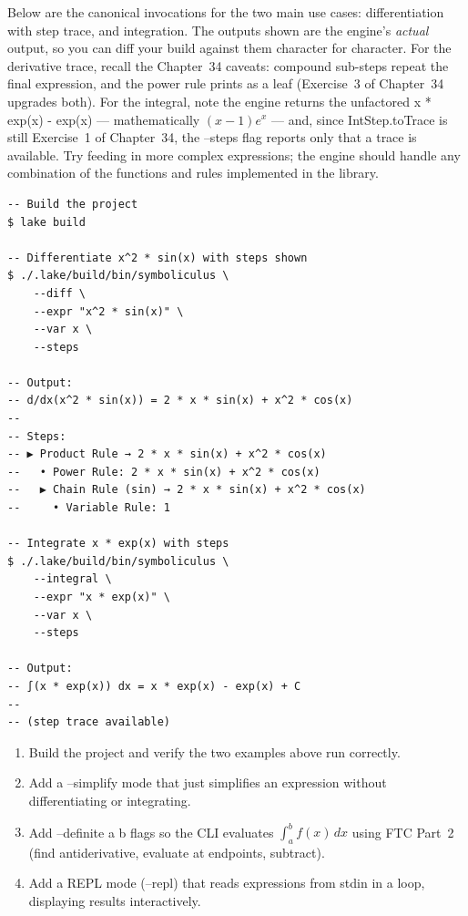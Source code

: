 \documentclass[12pt, openany]{book}
\theoremstyle{plain}
\theoremstyle{definition}
\theoremstyle{remark}
\newcommand{\li}[1]{{\ttfamily\small\color{tealaccent}#1}}
\begin{document}
Below are the canonical invocations for the two main use cases: differentiation with step trace, and integration.  The outputs shown are the engine's \emph{actual} output, so you can diff your build against them character for character.  For the derivative trace, recall the Chapter~34 caveats: compound sub-steps repeat the final expression, and the power rule prints as a leaf (Exercise~3 of Chapter~34 upgrades both).  For the integral, note the engine returns the unfactored \li{x * exp(x) - exp(x)} --- mathematically $(x-1)e^x$ --- and, since \li{IntStep.toTrace} is still Exercise~1 of Chapter~34, the \li{--steps} flag reports only that a trace is available.  Try feeding in more complex expressions; the engine should handle any combination of the functions and rules implemented in the library.

\begin{leanbox}
\begin{lstlisting}
-- Build the project
$ lake build

-- Differentiate x^2 * sin(x) with steps shown
$ ./.lake/build/bin/symboliculus \
    --diff \
    --expr "x^2 * sin(x)" \
    --var x \
    --steps

-- Output:
-- d/dx(x^2 * sin(x)) = 2 * x * sin(x) + x^2 * cos(x)
--
-- Steps:
-- ▶ Product Rule → 2 * x * sin(x) + x^2 * cos(x)
--   • Power Rule: 2 * x * sin(x) + x^2 * cos(x)
--   ▶ Chain Rule (sin) → 2 * x * sin(x) + x^2 * cos(x)
--     • Variable Rule: 1

-- Integrate x * exp(x) with steps
$ ./.lake/build/bin/symboliculus \
    --integral \
    --expr "x * exp(x)" \
    --var x \
    --steps

-- Output:
-- ∫(x * exp(x)) dx = x * exp(x) - exp(x) + C
--
-- (step trace available)
\end{lstlisting}
\end{leanbox}
\color{black}

\begin{exbox}
\begin{enumerate}
  \item Build the project and verify the two examples above run correctly.
  \item Add a \li{--simplify} mode that just simplifies an expression without
        differentiating or integrating.
  \item Add \li{--definite a b} flags so the CLI evaluates
        $\int_a^b f(x)\,dx$ using FTC Part~2 (find antiderivative,
        evaluate at endpoints, subtract).
  \item Add a REPL mode (\li{--repl}) that reads expressions from stdin in a loop,
        displaying results interactively.
\end{enumerate}
\end{exbox}
\color{black}
\end{document}
